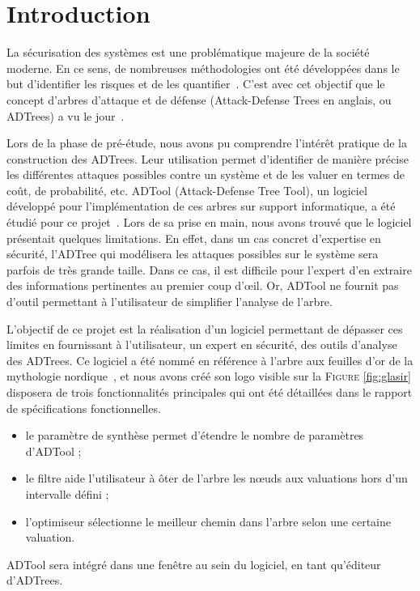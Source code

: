 \section{Introduction}
    \label{sec:intro}

    La sécurisation des systèmes est une problématique majeure de la société moderne. En ce sens, de nombreuses méthodologies ont été développées dans le but d'identifier les risques et de les quantifier~\cite{survey}. C'est avec cet objectif que le concept d'arbres d'attaque et de défense (\og Attack-Defense Trees \fg{} en anglais, ou ADTrees) a vu le jour~\cite{JLC}.

    Lors de la phase de pré-étude, nous avons pu comprendre l’intérêt pratique de la construction des ADTrees. Leur utilisation permet d'identifier de manière précise les différentes attaques possibles contre un système et de les valuer en termes de coût, de probabilité, etc. ADTool (Attack-Defense Tree Tool), un logiciel développé pour l'implémentation de ces arbres sur support informatique, a été étudié pour ce projet~\cite{ADTool}. Lors de sa prise en main, nous avons trouvé que le logiciel présentait quelques limitations. En effet, dans un cas concret d'expertise en sécurité, l'ADTree qui modélisera les attaques possibles sur le système sera parfois de très grande taille. Dans ce cas, il est difficile pour l'expert d'en extraire des informations pertinentes au premier coup d’œil. Or, ADTool ne fournit pas d'outil permettant à l'utilisateur de simplifier l'analyse de l'arbre. 

    L'objectif de ce projet est la réalisation d'un logiciel permettant de dépasser ces limites en fournissant à l'utilisateur, un expert en sécurité, des outils d'analyse des ADTrees. Ce logiciel a été nommé \glasir{} en référence à l'arbre aux feuilles d'or de la mythologie nordique~\cite{vikingCulture}, et nous avons créé son logo visible sur la \textsc{Figure} \ref{fig:glasir} disposera de trois fonctionnalités principales qui ont été détaillées dans le rapport de spécifications fonctionnelles. 
    \begin{itemize}
    	\item le paramètre de synthèse permet d'étendre le nombre de paramètres d'ADTool ;
    	\item le filtre aide l'utilisateur à ôter de l’arbre les nœuds aux valuations hors d'un intervalle défini ;
    	\item l'optimiseur sélectionne le meilleur chemin dans l'arbre selon une certaine valuation.
    \end{itemize}
    ADTool sera intégré dans une fenêtre au sein du logiciel, en tant qu'éditeur d'ADTrees. 

